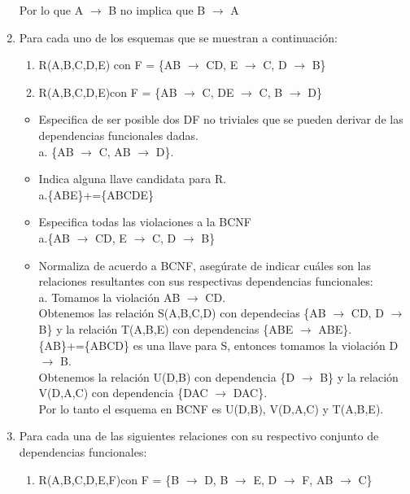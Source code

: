 \documentclass[a4paper, 12pt]{report}
\begin{document}
\begin{enumerate}
{\begin{enumerate}
	Por lo que A $\rightarrow$ B no implica que B $\rightarrow$ A
\end{enumerate}}
\item {Para cada uno de los esquemas que se muestran a continuación:
\begin{enumerate}
	\item R(A,B,C,D,E) con F = \{AB $\rightarrow$ CD, E $\rightarrow$ C, D
		$\rightarrow$ B\}
	\item R(A,B,C,D,E)con F = \{AB $\rightarrow$ C, DE $\rightarrow$ C, B $\rightarrow$ D\}
\end{enumerate}
\begin{itemize}
	\item Especifica de  ser  posible dos DF  no  triviales que  se  pueden
	derivar  de  las  dependencias funcionales dadas.\\
	a. \{AB $\rightarrow$ C, AB $\rightarrow$ D\}.\\
	\item Indica alguna llave candidata para R.\\
	a.\{ABE\}+=\{ABCDE\}\\
	\item Especifica todas las violaciones a la BCNF\\
	a.\{AB $\rightarrow$ CD, E $\rightarrow$ C, D
	$\rightarrow$ B\}
	\item Normaliza de acuerdo a BCNF, asegúrate de indicar cuáles son las
	relaciones resultantes con sus respectivas dependencias funcionales:\\
	a. Tomamos la violación AB $\rightarrow$ CD.\\
	Obtenemos las relación S(A,B,C,D) con dependecias \{AB $\rightarrow$ CD,
	D $\rightarrow$ B\} y la relación T(A,B,E) con dependencias \{ABE $\rightarrow$ ABE\}.\\
	\{AB\}+=\{ABCD\} es una llave para S, entonces tomamos la violación D $\rightarrow$ B.\\
	Obtenemos la relación U(D,B) con dependencia \{D $\rightarrow$ B\} y la
	relación V(D,A,C) con dependencia \{DAC $\rightarrow$ DAC\}.\\
	Por lo tanto el esquema en BCNF es U(D,B), V(D,A,C) y T(A,B,E).
\end{itemize}}
\item Para cada una de  las  siguientes  relaciones  con  su  respectivo  conjunto  de  dependencias funcionales:
\begin{enumerate}
	\item R(A,B,C,D,E,F)con F = \{B $\rightarrow$ D, B $\rightarrow$ E, D $\rightarrow$ F, AB $\rightarrow$ C\}

\end{enumerate}
\end{enumerate}
\end{document}
